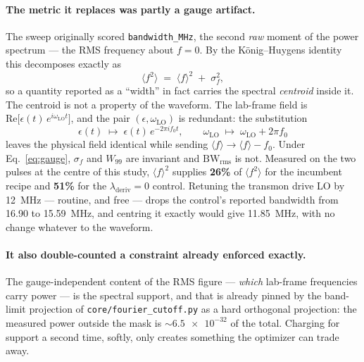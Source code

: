 \documentclass[11pt]{article}
\newcommand{\lamd}{\lambda_{\mathrm{deriv}}}
\begin{document}
\paragraph{The metric it replaces was partly a gauge artifact.}
The sweep originally scored \texttt{bandwidth\_MHz}, the second \emph{raw} moment of the power
spectrum --- the RMS frequency about $f = 0$. By the K\"onig--Huygens identity this decomposes
exactly as
%
\begin{equation}
\label{eq:kh}
\langle f^2 \rangle \;=\; \langle f \rangle^2 \;+\; \sigma_f^2 ,
\end{equation}
%
so a quantity reported as a ``width'' in fact carries the spectral \emph{centroid} inside it. The
centroid is not a property of the waveform. The lab-frame field is
$\mathrm{Re}\bigl[\epsilon(t)\,e^{i\omega_{\mathrm{LO}} t}\bigr]$, and the pair
$(\epsilon, \omega_{\mathrm{LO}})$ is redundant: the substitution
%
\begin{equation}
\label{eq:gauge}
\epsilon(t) \;\longmapsto\; \epsilon(t)\,e^{-2\pi i f_0 t},
\qquad
\omega_{\mathrm{LO}} \;\longmapsto\; \omega_{\mathrm{LO}} + 2\pi f_0
\end{equation}
%
leaves the physical field identical while sending $\langle f\rangle \to \langle f\rangle - f_0$.
Under Eq.~\eqref{eq:gauge}, $\sigma_f$ and $W_{99}$ are invariant and $\mathrm{BW}_{\mathrm{rms}}$
is not. Measured on the two pulses at the centre of this study, $\langle f\rangle^2$ supplies
\textbf{26\%} of $\langle f^2\rangle$ for the incumbent recipe and \textbf{51\%} for the
$\lamd = 0$ control. Retuning the transmon drive LO by \SI{12}{\mega\hertz} --- routine, and free
--- drops the control's reported bandwidth from \num{16.90} to \SI{15.59}{\mega\hertz}, and
centring it exactly would give \SI{11.85}{\mega\hertz}, with no change whatever to the waveform.

\paragraph{It also double-counted a constraint already enforced exactly.}
The gauge-independent content of the RMS figure --- \emph{which} lab-frame frequencies carry power
--- is the spectral support, and that is already pinned by the band-limit projection of
\texttt{core/fourier\_cutoff.py} as a hard orthogonal projection: the measured power outside the
mask is $\sim\!\num{6.5e-32}$ of the total. Charging for support a second time, softly, only
creates something the optimizer can trade away.
\end{document}
